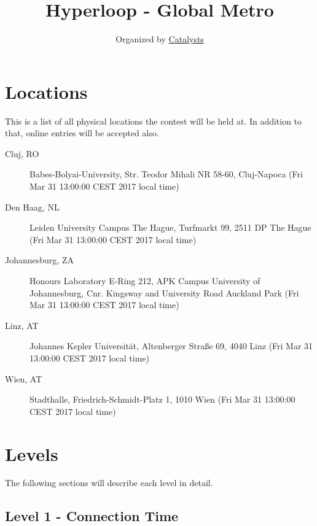 \documentclass[a4paper,11pt]{article}
\begin{document}
\title{Hyperloop - Global Metro}
\author{Organized by \href{https://contest.catalysts.cc/}{Catalysts}}
\maketitle
\vspace{1em}


\section{Locations}

This is a list of all physical locations the contest will be held at. In addition to that, online entries will be
accepted also.

\begin{description}
  \item[Cluj, RO] Babes-Bolyai-University, Str. Teodor Mihali NR 58-60, Cluj-Napoca (Fri Mar 31 13:00:00 CEST 2017 local time)
  \item[Den Haag, NL] Leiden University Campus The Hague, Turfmarkt 99, 2511 DP The Hague (Fri Mar 31 13:00:00 CEST 2017 local time)
  \item[Johannesburg, ZA] Honours Laboratory E-Ring 212, APK Campus University of Johannesburg, Cnr. Kingsway and University Road Auckland Park (Fri Mar 31 13:00:00 CEST 2017 local time)
  \item[Linz, AT] Johannes Kepler Universität, Altenberger Straße 69, 4040 Linz (Fri Mar 31 13:00:00 CEST 2017 local time)
  \item[Wien, AT] Stadthalle, Friedrich-Schmidt-Platz 1, 1010 Wien (Fri Mar 31 13:00:00 CEST 2017 local time)
\end{description}


\section{Levels}

The following sections will describe each level in detail.

\subsection{Level 1 - Connection Time}
\end{document}
